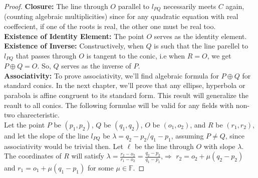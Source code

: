 \begin{proof}
  \textbf{Closure:} The line through $O$ parallel to $l_{PQ}$ necessarily meets $C$ again,(counting algebraic multiplicities)
  since for any quadratic equation with real coeffecient, if one of the roots is real, the other one must be real too.\\
 
  \textbf{Existence of Identity Element:} The point $O$ serves as the identity element.\\
 
  \textbf{Existence of Inverse:} Constructively, when $Q$ is such that the line parellel to $l_{PQ}$
  that passes through $O$ is tangent to the conic, i.e when $R=O$, we get $P\oplus Q=O$. So, $Q$ serves as the
  inverse of $P$.\\
 
  \textbf{Associativity:} To prove associativity, we'll find algebraic formula for $P\oplus Q$ for standard conics.
  In the next chapter, we'll prove that any ellipse, hyperbola or parabola is affine congruent to its standard form.
  This result will generalize the reault to all conics. The following formulae will be valid for any fields with non-two charecteristic.\\

  Let the point $P$ be $(p_1,p_2)$, $Q$ be $(q_1,q_2)$, $O$ be $(o_1,o_2)$, and $R$ be $(r_1,r_2)$, and let the slope of the line $l_{PQ}$ be $\lambda=q_2-p_2/q_1-p_1$,
  assuming $P\not=Q$, since associativity would be trivial then. Let $\ell$ be the line through $O$ with slope $\lambda$. The coordinates of $R$ will satisfy
  $\lambda=\frac{r_2-o_2}{r_1-o_2}=\frac{q_2-p_2}{q_1-p_1}$,$\Rightarrow$ $r_2=o_2+\mu(q_2-p_2)$ and $r_1=o_1+\mu(q_1-p_1)$ for some $\mu\in\mathbb{F}$.


\end{proof}
